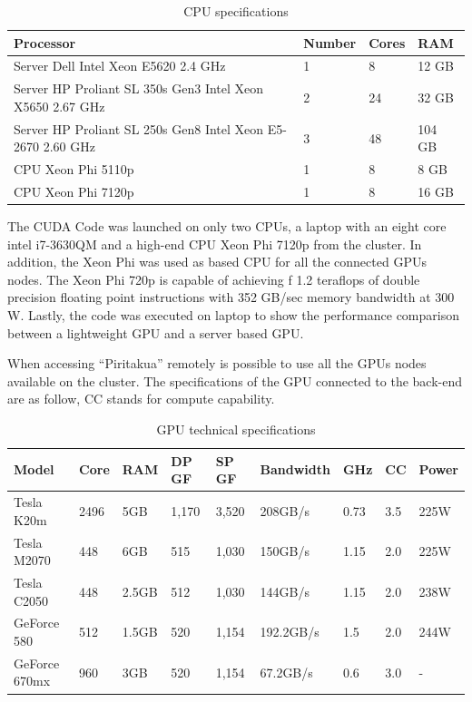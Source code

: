 \begin{table}[h]
\centering
\begin{tabular}{ | p{7.1cm}  | l | l | l |}
  \hline
  Processor & Number & Cores & RAM  \\
  \hline
  Server Dell Intel Xeon E5620 2.4 GHz & 1 & 8 & 12 GB \\
  \hline
  Server HP Proliant SL 350s Gen3 Intel Xeon X5650 2.67 GHz & 2 & 24 & 32 GB \\
  \hline
   Server HP Proliant SL 250s Gen8 Intel Xeon E5-2670 2.60 GHz & 3 & 48 & 104 GB \\
   \hline
   CPU Xeon Phi  5110p & 1 & 8 & 8 GB\\
   \hline
   CPU Xeon Phi 7120p  & 1 & 8 & 16 GB\\
   \hline
  \end{tabular}
      \caption{CPU specifications}
  \label{tab:cpus}
  \end{table}
  
 The CUDA Code was launched on only two CPUs, a laptop with an eight core intel i7-3630QM and a high-end CPU Xeon Phi 7120p from the cluster. In addition, the Xeon Phi was used as based CPU for all the connected GPUs nodes. The Xeon Phi 720p is capable of achieving f 1.2 teraflops of double precision floating point instructions with 352 GB/sec memory bandwidth at 300 W. Lastly, the code was executed on laptop to show the performance comparison between a lightweight GPU and a server based GPU.

When accessing ``Piritakua'' remotely is possible to use all the GPUs nodes available on the cluster. The specifications of the GPU connected to the back-end are as follow, CC stands for compute capability.

\begin{table}[h]
\centering
  \begin{tabular}{ |  l  |  l  |  l  |  l  |  l  | l | l | l |l | }
    \hline
    Model & Core& RAM& DP GF& SP GF& Bandwidth& GHz& CC & Power\\
    \hline
    Tesla K20m & 2496 & 5GB & 1,170 & 3,520 & 208GB/s & 0.73 & 3.5 & 225W \\
   \hline
    Tesla M2070 & 448 & 6GB & 515 & 1,030 & 150GB/s & 1.15 &  2.0 & 225W\\
   \hline
     Tesla C2050 & 448 & 2.5GB & 512 & 1,030 & 144GB/s & 1.15  & 2.0 & 238W \\
   \hline
      GeForce 580 & 512 & 1.5GB & 520 & 1,154 & 192.2GB/s & 1.5 & 2.0 & 244W \\
   \hline
   GeForce 670mx & 960 & 3GB & 520 & 1,154 & 67.2GB/s & 0.6 & 3.0 &  - \\
   \hline
  \end{tabular}
    \caption{GPU technical specifications}
  \label{tab:gpus}
  \end{table}
  
